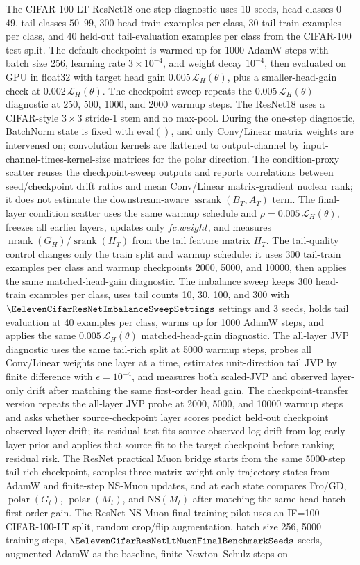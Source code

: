 \documentclass{article}
\theoremstyle{definition}
\newcommand{\Loss}{\mathcal L}
\newcommand{\srank}{\operatorname{srank}}
\newcommand{\nrank}{\operatorname{nrank}}
\newcommand{\ssrank}{\operatorname{ssrank}}
\newcommand{\polar}{\operatorname{polar}}
\begin{document}
The CIFAR-100-LT ResNet18 one-step diagnostic uses \(10\) seeds, head classes \(0\)--\(49\), tail classes \(50\)--\(99\), 300 head-train examples per class, 30 tail-train examples per class, and 40 held-out tail-evaluation examples per class from the CIFAR-100 test split. The default checkpoint is warmed up for 1000 AdamW steps with batch size 256, learning rate \(3\times 10^{-4}\), and weight decay \(10^{-4}\), then evaluated on GPU in float32 with target head gain \(0.005\,\Loss_H(\theta)\), plus a smaller-head-gain check at \(0.002\,\Loss_H(\theta)\). The checkpoint sweep repeats the \(0.005\,\Loss_H(\theta)\) diagnostic at 250, 500, 1000, and 2000 warmup steps. The ResNet18 uses a CIFAR-style \(3\times3\) stride-1 stem and no max-pool. During the one-step diagnostic, BatchNorm state is fixed with \(\mathrm{eval}()\), and only Conv/Linear matrix weights are intervened on; convolution kernels are flattened to output-channel by input-channel-times-kernel-size matrices for the polar direction. The condition-proxy scatter reuses the checkpoint-sweep outputs and reports correlations between seed/checkpoint drift ratios and mean Conv/Linear matrix-gradient nuclear rank; it does not estimate the downstream-aware \(\ssrank(B_T,A_T)\) term. The final-layer condition scatter uses the same warmup schedule and \(\rho=0.005\,\Loss_H(\theta)\), freezes all earlier layers, updates only \(fc.weight\), and measures \(\nrank(G_H)/\srank(H_T)\) from the tail feature matrix \(H_T\). The tail-quality control changes only the train split and warmup schedule: it uses 300 tail-train examples per class and warmup checkpoints 2000, 5000, and 10000, then applies the same matched-head-gain diagnostic. The imbalance sweep keeps 300 head-train examples per class, uses tail counts 10, 30, 100, and 300 with \(\EelevenCifarResNetImbalanceSweepSettings\) settings and 3 seeds, holds tail evaluation at 40 examples per class, warms up for 1000 AdamW steps, and applies the same \(0.005\,\Loss_H(\theta)\) matched-head-gain diagnostic. The all-layer JVP diagnostic uses the same tail-rich split at 5000 warmup steps, probes all Conv/Linear weights one layer at a time, estimates unit-direction tail JVP by finite difference with \(\epsilon=10^{-4}\), and measures both scaled-JVP and observed layer-only drift after matching the same first-order head gain. The checkpoint-transfer version repeats the all-layer JVP probe at 2000, 5000, and 10000 warmup steps and asks whether source-checkpoint layer scores predict held-out checkpoint observed layer drift; its residual test fits source observed log drift from log early-layer prior and applies that source fit to the target checkpoint before ranking residual risk. The ResNet practical Muon bridge starts from the same 5000-step tail-rich checkpoint, samples three matrix-weight-only trajectory states from AdamW and finite-step NS-Muon updates, and at each state compares Fro/GD, \(\polar(G_t)\), \(\polar(M_t)\), and \(\mathrm{NS}(M_t)\) after matching the same head-batch first-order gain. The ResNet NS-Muon final-training pilot uses an IF=100 CIFAR-100-LT split, random crop/flip augmentation, batch size 256, 5000 training steps, \(\EelevenCifarResNetLtMuonFinalBenchmarkSeeds\) seeds, augmented AdamW as the baseline, finite Newton--Schulz steps on 
\end{document}
